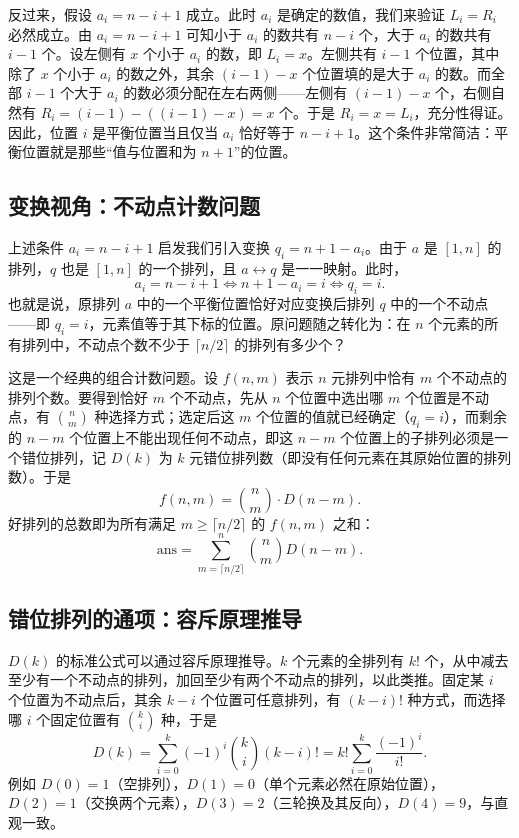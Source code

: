 反过来，假设 $a_i = n - i + 1$ 成立。此时 $a_i$ 是确定的数值，我们来验证 $L_i = R_i$ 必然成立。由 $a_i = n - i + 1$ 可知小于 $a_i$ 的数共有 $n - i$ 个，大于 $a_i$ 的数共有 $i - 1$ 个。设左侧有 $x$ 个小于 $a_i$ 的数，即 $L_i = x$。左侧共有 $i - 1$ 个位置，其中除了 $x$ 个小于 $a_i$ 的数之外，其余 $(i - 1) - x$ 个位置填的是大于 $a_i$ 的数。而全部 $i - 1$ 个大于 $a_i$ 的数必须分配在左右两侧——左侧有 $(i - 1) - x$ 个，右侧自然有 $R_i = (i - 1) - ((i - 1) - x) = x$ 个。于是 $R_i = x = L_i$，充分性得证。因此，位置 $i$ 是平衡位置当且仅当 $a_i$ 恰好等于 $n - i + 1$。这个条件非常简洁：平衡位置就是那些“值与位置和为 $n + 1$”的位置。

\subsection{变换视角：不动点计数问题}

上述条件 $a_i = n - i + 1$ 启发我们引入变换 $q_i = n + 1 - a_i$。由于 $a$ 是 $[1, n]$ 的排列，$q$ 也是 $[1, n]$ 的一个排列，且 $a \leftrightarrow q$ 是一一映射。此时，
\[
a_i = n - i + 1 \iff n + 1 - a_i = i \iff q_i = i.
\]
也就是说，原排列 $a$ 中的一个平衡位置恰好对应变换后排列 $q$ 中的一个不动点——即 $q_i = i$，元素值等于其下标的位置。原问题随之转化为：在 $n$ 个元素的所有排列中，不动点个数不少于 $\lceil n/2 \rceil$ 的排列有多少个？

这是一个经典的组合计数问题。设 $f(n, m)$ 表示 $n$ 元排列中恰有 $m$ 个不动点的排列个数。要得到恰好 $m$ 个不动点，先从 $n$ 个位置中选出哪 $m$ 个位置是不动点，有 $\binom{n}{m}$ 种选择方式；选定后这 $m$ 个位置的值就已经确定（$q_i = i$），而剩余的 $n - m$ 个位置上不能出现任何不动点，即这 $n - m$ 个位置上的子排列必须是一个错位排列，记 $D(k)$ 为 $k$ 元错位排列数（即没有任何元素在其原始位置的排列数）。于是
\[
f(n, m) = \binom{n}{m} \cdot D(n - m).
\]
好排列的总数即为所有满足 $m \ge \lceil n/2 \rceil$ 的 $f(n, m)$ 之和：
\[
\mathrm{ans} = \sum_{m = \lceil n/2 \rceil}^{n} \binom{n}{m} D(n - m).
\]

\subsection{错位排列的通项：容斥原理推导}

$D(k)$ 的标准公式可以通过容斥原理推导。$k$ 个元素的全排列有 $k!$ 个，从中减去至少有一个不动点的排列，加回至少有两个不动点的排列，以此类推。固定某 $i$ 个位置为不动点后，其余 $k - i$ 个位置可任意排列，有 $(k - i)!$ 种方式，而选择哪 $i$ 个固定位置有 $\binom{k}{i}$ 种，于是
\[
D(k) = \sum_{i=0}^{k} (-1)^i \binom{k}{i} (k - i)!
     = k! \sum_{i=0}^{k} \frac{(-1)^i}{i!}.
\]
例如 $D(0) = 1$（空排列），$D(1) = 0$（单个元素必然在原始位置），$D(2) = 1$（交换两个元素），$D(3) = 2$（三轮换及其反向），$D(4) = 9$，与直观一致。

